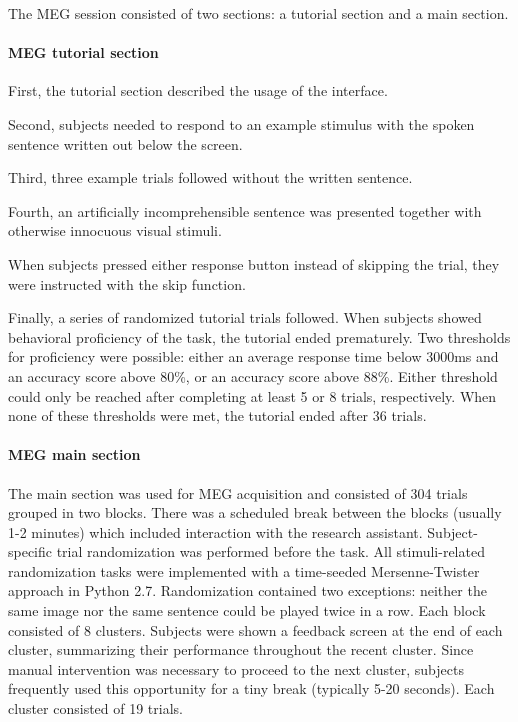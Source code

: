 The MEG session consisted of two sections: a tutorial section and a main section.

\paragraph{MEG tutorial section}

First, the tutorial section described the usage of the interface.

Second, subjects needed to respond to an example stimulus with the spoken sentence written out below the screen.

Third, three example trials followed without the written sentence.

Fourth, an artificially incomprehensible sentence was presented together with otherwise innocuous visual stimuli.

When subjects pressed either response button instead of skipping the trial, they were instructed with the skip function.

Finally, a series of randomized tutorial trials followed.
When subjects showed behavioral proficiency of the task, the tutorial ended prematurely.
Two thresholds for proficiency were possible: either an average response time below 3000ms and an accuracy score above 80\%, or an accuracy score above 88\%.
Either threshold could only be reached after completing at least 5 or 8 trials, respectively.
When none of these thresholds were met, the tutorial ended after 36 trials.

\paragraph{MEG main section}
The main section was used for MEG acquisition and consisted of 304 trials grouped in two blocks.
There was a scheduled break between the blocks (usually 1-2 minutes) which included interaction with the research assistant.
Subject-specific trial randomization was performed before the task.
All stimuli-related randomization tasks were implemented with a time-seeded Mersenne-Twister approach in Python 2.7.
Randomization contained two exceptions: neither the same image nor the same sentence could be played twice in a row.
Each block consisted of 8 clusters.
Subjects were shown a feedback screen at the end of each cluster, summarizing their performance throughout the recent cluster.
Since manual intervention was necessary to proceed to the next cluster, subjects frequently used this opportunity for a tiny break (typically 5-20 seconds).
Each cluster consisted of 19 trials.


